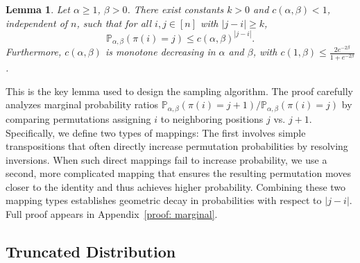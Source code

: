\documentclass{article}
\renewcommand{\P}{\mathbb{P}}
\newcommand{\sS}{\sf S}
\newtheorem{lemma}[theorem]{Lemma}     %
\newtheorem{remark}[theorem]{Remark} %
\begin{document}
\begin{lemma}\label{lm:Pij_decay}
Let \( \alpha \geq 1 \), $\beta>0$. There exist constants \( k > 0 \) and \( c(\alpha, \beta) < 1 \), independent of \( n \), such that for all \( i, j \in [n] \) with \( |j - i| \geq k \),
\[{\P}_{\alpha, \beta}\left(\pi(i) = j \right)\leq c(\alpha,\beta)^{|j-i|}.\]
Furthermore,  $c(\alpha,\beta)$ is monotone decreasing in $\alpha$ and $\beta$, with $c(1,\beta)\leq \frac{2e^{-2\beta}}{1+e^{-2\beta}}$.
\end{lemma}
This is the key lemma used to design the sampling algorithm. The proof carefully analyzes marginal probability ratios  $\P_{\alpha,\beta}(\pi(i)=j+1)/\P_{\alpha,\beta}(\pi(i)=j)$ by comparing permutations assigning $i$ to neighboring positions $j$ vs. $j+1$. Specifically, we define two types of mappings: The first involves simple transpositions that often directly increase permutation probabilities by resolving inversions. When such direct mappings fail to increase probability, we use a second, more complicated mapping that ensures the resulting permutation moves closer to the identity and thus achieves higher probability.
Combining these two mapping types establishes geometric decay in probabilities with respect to  $|j-i|$.
Full proof appears in Appendix~\ref{proof: marginal}.


\subsection{Truncated Distribution}\label{sec:truncate approx}

\end{document}
